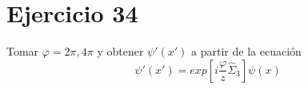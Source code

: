 \section*{Ejercicio 34}
Tomar $\varphi=2\pi,4\pi$ y obtener ${\psi}'({x}')$ a partir de la ecuación
\begin{equation*}
    {\psi}'({x}') = exp\left[i\frac{\varphi}{z}\hat{\Sigma}_3\right] \psi(x)
\end{equation*}